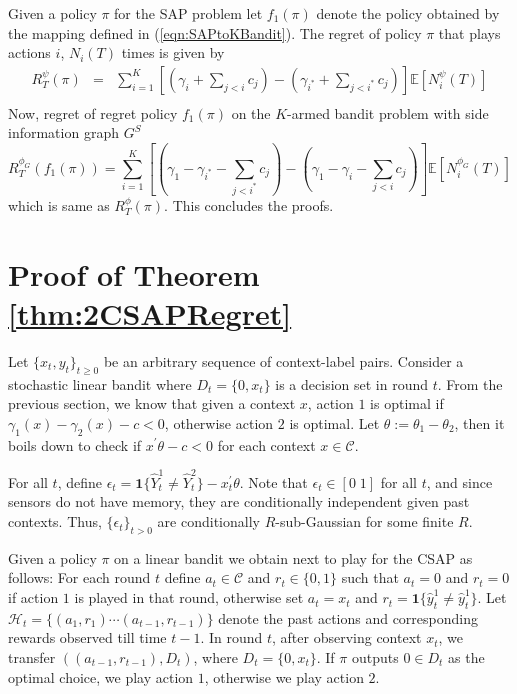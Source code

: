 \documentclass{article}
\begin{document}
Given a policy $\pi$ for the SAP problem let $f_1(\pi)$ denote the policy obtained by the mapping defined in (\ref{eqn:SAPtoKBandit}). The regret of policy $\pi$ that plays actions $i$, $N_i(T)$ times is given by 
\begin{eqnarray}
R^\psi_T(\pi) &=&\sum_{i=1}^{K}\left [ \left (\gamma_{i}+\sum_{j< i} c_j\right )-\left (\gamma_{i^*}+\sum_{j < i^*} c_j\right )\right ]\mathbb{E}[N^\psi_i(T)]\\
\end{eqnarray}
Now, regret of regret policy $f_1(\pi)$ on the $K$-armed bandit problem with side information graph $G^S$ 
\begin{equation}
R^{\phi_G}_T(f_1(\pi))=\sum_{i=1}^{K} \left[\left (\gamma_1-\gamma_{i^*}-\sum_{j <i^*} c_j \right )-\left (\gamma_1- \gamma_{i}-\sum_{j < i} c_j \right )\right ]\mathbb{E}[N^{\phi_G}_i(T)]
\end{equation}
which is same as $R^\phi_T(\pi)$. This concludes the proofs. 
\section{Proof of Theorem \ref{thm:2CSAPRegret}}
Let $\{x_t,y_t\}_{t\geq 0}$ be an arbitrary sequence of context-label pairs. Consider a stochastic linear bandit where $D_t=\{0, x_t\} $ is a decision set in round $t$. 
From the previous section, we know that given a context $x$, action $1$ is optimal if $\gamma_1(x)-\gamma_2(x) -c< 0$, otherwise  action $2$ is optimal. Let $\theta:=\theta_1-\theta_2$, then it boils down to check if $x^\prime\theta-c<0$ for each context $x\in \mathcal{C}$. 

For all $t$, define $\epsilon_t= \boldsymbol{1}\{\hat{Y}^1_t \neq \hat{Y}^2_t\}-x_t^\prime\theta$. Note that $\epsilon_t \in [0 \;1]$ for all $t$, and since sensors do not have memory, they are conditionally independent given past contexts. Thus, $\{\epsilon_t\}_{t>0}$ are conditionally $R$-sub-Gaussian for some finite $R$.  

Given a policy $\pi$ on a linear bandit we obtain next to play for the CSAP as follows: For each round $t$ define $a_t \in \mathcal{C}$ and $r_t \in \{0,1\}$ such that $a_t=0$ and $r_t=0$ if action $1$ is played in that round, otherwise set $a_t=x_t$ and $r_t=\boldsymbol{1}\{\hat{y}^1_t \neq \hat{y}^1_t \}$. Let $\mathcal{H}_{t}=\{(a_1, r_1)\cdots (a_{t-1},r_{t-1})\}$ denote the past actions and corresponding rewards observed till time $t-1$. In round $t$, after observing context $x_t$, we transfer  $((a_{t-1},r_{t-1}), D_t)$, where  $D_t=\{0,x_t\}$. If $\pi$ outputs $0 \in D_t$ as the optimal choice, we play action $1$, otherwise we play action $2$.
\end{document}
